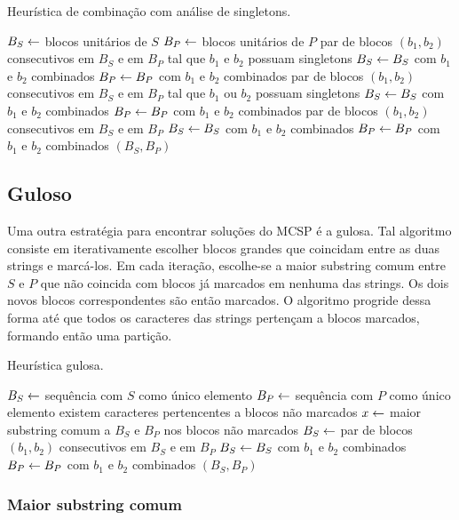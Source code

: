         \begin{algorithm}
        \caption{Heurística de combinação com análise de singletons.} \label{alg:combineS}
        \begin{codebox}
        \li $B_S \leftarrow$ blocos unitários de $S$
        \li $B_P \leftarrow$ blocos unitários de $P$
        \li \Para \Cada par de blocos $(b_1, b_2)$ consecutivos em $B_S$ e em $B_P$
        \zi tal que $b_1$ e $b_2$ possuam singletons \Faca
            \Do
        \li     $B_S \leftarrow B_S$ com $b_1$ e $b_2$ combinados
        \li     $B_P \leftarrow B_P$ com $b_1$ e $b_2$ combinados
            \End
        \li \Para \Cada par de blocos $(b_1, b_2)$ consecutivos em $B_S$ e em $B_P$
        \zi tal que $b_1$ ou $b_2$ possuam singletons \Faca
            \Do
        \li     $B_S \leftarrow B_S$ com $b_1$ e $b_2$ combinados
        \li     $B_P \leftarrow B_P$ com $b_1$ e $b_2$ combinados
            \End
        \li \Para \Cada par de blocos $(b_1, b_2)$ consecutivos em $B_S$ e em $B_P$ \Faca
            \Do
        \li     $B_S \leftarrow B_S$ com $b_1$ e $b_2$ combinados
        \li     $B_P \leftarrow B_P$ com $b_1$ e $b_2$ combinados
            \End
        \li \Devolva $(B_S, B_P)$
        \end{codebox}
    \end{algorithm}

\subsection{Guloso}

    Uma outra estratégia para encontrar soluções do MCSP é a gulosa. Tal algoritmo consiste em iterativamente escolher blocos grandes que coincidam entre as duas strings e marcá-los. Em cada iteração, escolhe-se a maior substring comum entre $S$ e $P$ que não coincida com blocos já marcados em nenhuma das strings. Os dois novos blocos correspondentes são então marcados. O algoritmo progride dessa forma até que todos os caracteres das strings pertençam a blocos marcados, formando então uma partição.

    \begin{algorithm}
        \caption{Heurística gulosa.} \label{alg:greedy}
        \begin{codebox}
        \li $B_S \leftarrow$ sequência com $S$ como único elemento
        \li $B_P \leftarrow$ sequência com $P$ como único elemento
        \li \Enquanto existem caracteres pertencentes a blocos não marcados \Faca
            \Do
        \li     $x \leftarrow$ maior substring comum a $B_S$ e $B_P$ nos blocos não marcados
        \li     $B_S \leftarrow$ 
            \End
        \li \Para \Cada par de blocos $(b_1, b_2)$ consecutivos em $B_S$ e em $B_P$ \Faca
            \Do
        \li     $B_S \leftarrow B_S$ com $b_1$ e $b_2$ combinados
        \li     $B_P \leftarrow B_P$ com $b_1$ e $b_2$ combinados
            \End
        \li \Devolva $(B_S, B_P)$
        \end{codebox}
    \end{algorithm}

    \subsubsection{Maior substring comum}

